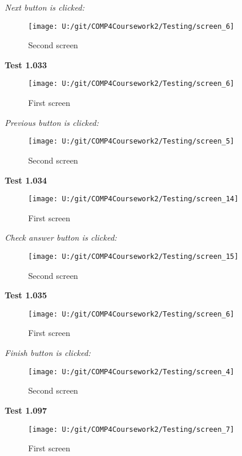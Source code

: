 \textit{Next button is clicked: }

\begin{figure}[H]
    \label{fig: Second Screen}\caption{Second screen}
    \texttt{[image: U:/git/COMP4Coursework2/Testing/screen\_6]}
\end{figure}

\textbf{Test 1.033}

\begin{figure}[H]
    \label{fig: First Screen}\caption{First screen}
    \texttt{[image: U:/git/COMP4Coursework2/Testing/screen\_6]}
\end{figure}

\textit{Previous button is clicked: }

\begin{figure}[H]
    \label{fig: Second Screen}\caption{Second screen}
    \texttt{[image: U:/git/COMP4Coursework2/Testing/screen\_5]}
\end{figure}

\textbf{Test 1.034}

\begin{figure}[H]
    \label{fig: First Screen}\caption{First screen}
    \texttt{[image: U:/git/COMP4Coursework2/Testing/screen\_14]}
\end{figure}

\textit{Check answer button is clicked: }

\begin{figure}[H]
    \label{fig: Second Screen}\caption{Second screen}
    \texttt{[image: U:/git/COMP4Coursework2/Testing/screen\_15]}
\end{figure}

\textbf{Test 1.035}

\begin{figure}[H]
    \label{fig: First Screen}\caption{First screen}
    \texttt{[image: U:/git/COMP4Coursework2/Testing/screen\_6]}
\end{figure}

\textit{Finish button is clicked: }

\begin{figure}[H]
    \label{fig: Second Screen}\caption{Second screen}
    \texttt{[image: U:/git/COMP4Coursework2/Testing/screen\_4]}
\end{figure}

\textbf{Test 1.097}

\begin{figure}[H]
    \label{fig: First Screen}\caption{First screen}
    \texttt{[image: U:/git/COMP4Coursework2/Testing/screen\_7]}
\end{figure}


